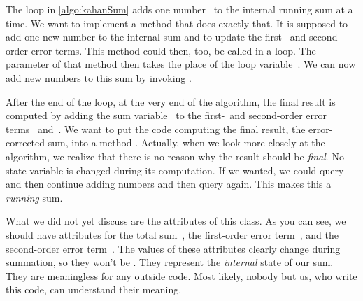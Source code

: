 The loop in \cref{algo:kahanSum} adds one number~ to the internal running sum at a time.
We want to implement a method  that does exactly that.
It is supposed to add one new number to the internal sum and to update the first-\ and second-order error terms.
This method could then, too, be called in a loop.
The parameter  of that method then takes the place of the loop variable~.
We can now add new numbers to this sum by invoking .

After the end of the loop, at the very end of the algorithm, the final result is computed by adding the sum variable~ to the first-\ and second-order error terms~ and~.
We want to put the code computing the final result, the error-corrected sum, into a method .
Actually, when we look more closely at the algorithm, we realize that there is no reason why the result should be \emph{final}.
No state variable is changed during its computation.
If we wanted, we could query  and then continue adding numbers and then query  again.
This makes this a \emph{running} sum.

What we did not yet discuss are the attributes of this class.
As you can see, we should have attributes for the total sum~, the first-order error term~, and the second-order error term~.
The values of these attributes clearly change during summation, so they won't be .
They represent the \emph{internal} state of our sum.
They are meaningless for any outside code.
Most likely, nobody but us, who write this code, can understand their meaning.

